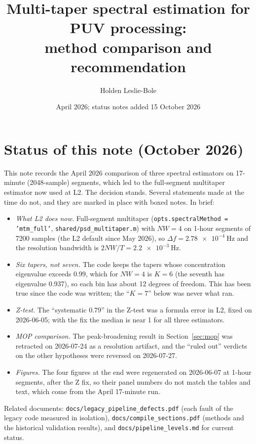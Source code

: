\documentclass[11pt]{article}
\title{Multi-taper spectral estimation for PUV processing:\\
       method comparison and recommendation}
\author{Holden Leslie-Bole}
\date{April 2026; status notes added 15 October 2026}
\begin{document}
\maketitle

\section*{Status of this note (October 2026)}

This note records the April 2026 comparison of three spectral estimators on
17-minute (2048-sample) segments, which led to the full-segment multitaper
estimator now used at L2. The decision stands. Several statements made at the
time do not, and they are marked in place with boxed notes. In brief:
\begin{itemize}
  \item \emph{What L2 does now.} Full-segment multitaper
    (\texttt{opts.spectralMethod = 'mtm\_full'}, \texttt{shared/psd\_multitaper.m})
    with $NW = 4$ on 1-hour segments of 7200 samples (the L2 default since May
    2026), so $\Delta f = \SI{2.78e-4}{\hertz}$ and the resolution bandwidth is
    $2NW/T = \SI{2.2e-3}{\hertz}$.
  \item \emph{Six tapers, not seven.} The code keeps the tapers whose
    concentration eigenvalue exceeds 0.99, which for $NW = 4$ is $K = 6$
    (the seventh has eigenvalue 0.937), so each bin has about 12 degrees of
    freedom. This has been true since the code was written; the ``$K = 7$''
    below was never what ran.
  \item \emph{Z-test.} The ``systematic 0.79'' in the Z-test was a formula error
    in L2, fixed on 2026-06-05; with the fix the median is near 1 for all three
    estimators.
  \item \emph{MOP comparison.} The peak-broadening result in
    Section~\ref{sec:mop} was retracted on 2026-07-24 as a resolution artifact,
    and the ``ruled out'' verdicts on the other hypotheses were reversed on
    2026-07-27.
  \item \emph{Figures.} The four figures at the end were regenerated on
    2026-06-07 at 1-hour segments, after the Z fix, so their panel numbers do not
    match the tables and text, which come from the April 17-minute run.
\end{itemize}
Related documents: \texttt{docs/legacy\_pipeline\_defects.pdf} (each fault of
the legacy code measured in isolation), \texttt{docs/compile\_sections.pdf}
(methods and the historical validation results), and \texttt{docs/pipeline\_levels.md}
for current status.
\end{document}
